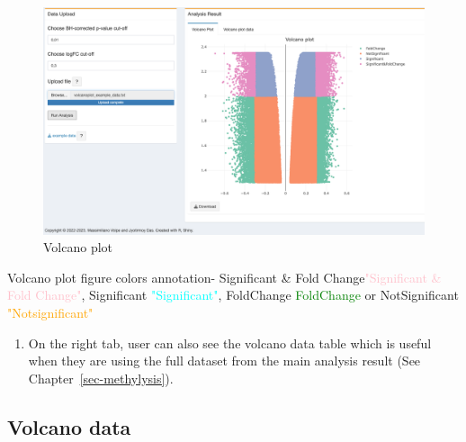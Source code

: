 \documentclass[
  a4paper,
  oneside,
  open=any]{scrreport}
\providecommand{\tightlist}{%
  \setlength{\itemsep}{0pt}\setlength{\parskip}{0pt}}\usepackage{longtable,booktabs,array}
\begin{document}
\begin{figure}[H]

{\centering \includegraphics{./_images/Volcano1.png}

}

\caption{Volcano plot}

\end{figure}

\begin{tcolorbox}[enhanced jigsaw, bottomrule=.15mm, left=2mm, coltitle=black, breakable, colback=white, arc=.35mm, rightrule=.15mm, opacitybacktitle=0.6, toptitle=1mm, leftrule=.75mm, toprule=.15mm, bottomtitle=1mm, opacityback=0, colbacktitle=quarto-callout-tip-color!10!white, titlerule=0mm, colframe=quarto-callout-tip-color-frame, title=\textcolor{quarto-callout-tip-color}{\faLightbulb}\hspace{0.5em}{Tip}]

Volcano plot figure colors annotation- {Significant \& Fold
Change}\textcolor{pink}{"Significant \& Fold Change"}, {Significant}
\textcolor{cyan}{"Significant"}, {FoldChange}
\textcolor{green}{FoldChange} or {NotSignificant}
\textcolor{orange}{"Notsignificant"}

\end{tcolorbox}

\begin{enumerate}
\def\labelenumi{\arabic{enumi}.}
\setcounter{enumi}{2}
\tightlist
\item
  On the right tab, user can also see the volcano data table which is
  useful when they are using the full dataset from the main analysis
  result (See Chapter~\ref{sec-methylysis}).
\end{enumerate}

\hypertarget{volcano-data}{%
\subsection{Volcano data}\label{volcano-data}}
\end{document}
